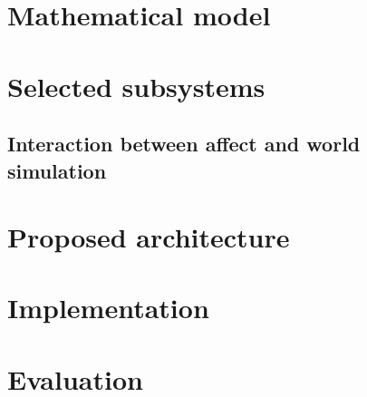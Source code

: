 \documentclass[]{scrartcl}
\begin{document}


\section{Mathematical model}\label{sec:mathematicalModel}



\section{Selected subsystems}\label{sec:selectedSubsystems}



\subsection{Interaction between affect and world simulation}



\section{Proposed architecture}\label{sec:proposedArchitecture}


\section{Implementation}



\section{Evaluation}


\endgroup

\pagebreak

\nocite{*}



\end{document}
